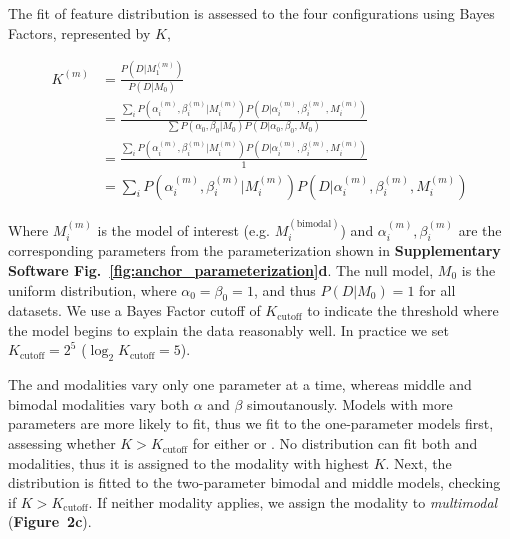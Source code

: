 The fit of feature distribution is assessed to the four configurations using Bayes Factors, represented by $K$,

\begin{align}
K^{(m)} 
&= \frac{P(D | M_1^{(m)})}{P(D | M_0)}\\
&= 
\frac{\sum_{i} P(\alpha_i^{(m)}, \beta_i^{(m)} | M_i^{(m)}) P(D | \alpha_i^{(m)}, \beta_i^{(m)}, M_i^{(m)})}
{\sum P(\alpha_0, \beta_0 | M_0) P(D | \alpha_0, \beta_0, M_0)}\\
&= 
\frac{\sum_{i} P(\alpha_i^{(m)}, \beta_i^{(m)} | M_i^{(m)}) P(D | \alpha_i^{(m)}, \beta_i^{(m)}, M_i^{(m)})}
{1}\\
&= 
\sum_{i} P(\alpha_i^{(m)}, \beta_i^{(m)} | M_i^{(m)}) P(D | \alpha_i^{(m)}, \beta_i^{(m)}, M_i^{(m)})
\end{align}

Where $M_i^{(m)}$ is the model of interest (e.g. $M_i^{(\mathrm{bimodal})}$) and $\alpha_i^{(m)}, \beta_i^{(m)}$ are the corresponding parameters from the parameterization shown in \textbf{Supplementary Software Fig.~\ref{fig:anchor_parameterization}d}. The null model, $M_0$ is the uniform distribution, where $\alpha_0 = \beta_0 = 1$, and thus $P(D|M_0) = 1$ for all datasets. We use a Bayes Factor cutoff of $K_{\mathrm{cutoff}}$ to indicate the threshold where the model begins to explain the data reasonably well. In practice we set $K_{\mathrm{cutoff}} = 2^{5}$ ($\log_2 K_\mathrm{cutoff} = 5$).

The \0 and \1 modalities vary only one parameter at a time, whereas middle and bimodal modalities vary both $\alpha$ and $\beta$ simoutanously. Models with more parameters are more likely to fit, thus we fit to the one-parameter models first, assessing whether $K > K_{\mathrm{cutoff}}$ for either \0 or \1. No distribution can fit both \0 and \1 modalities, thus it is assigned to the modality with highest $K$. Next, the distribution is fitted to the two-parameter bimodal and middle models, checking if $K > K_{\mathrm{cutoff}}$. If neither modality applies, we assign the modality to \emph{multimodal} (\textbf{Figure~2c}). 

